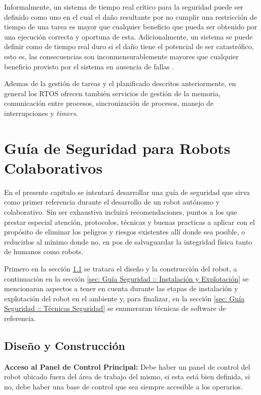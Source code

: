 \documentclass[withindex,glossary]{cam-thesis}
\begin{document}
Informalmente, un sistema de tiempo real crítico para la seguridad puede ser definido como uno en el cual el daño resultante por no cumplir una restricción de tiempo de una tarea es mayor que cualquier beneficio que pueda ser obtenido por una ejecución correcta y oportuna de esta. Adicionalmente, un sistema se puede definir como de tiempo real duro si el daño tiene el potencial de ser catastrófico, esto es, las consecuencias son inconmensurablemente mayores que cualquier beneficio provisto por el sistema en ausencia de fallas \cite{audsley1990real}.

Ademas de la gestión de tareas y el planificado descritos anteriormente, en general los RTOS ofrecen también servicios de gestión de la memoria, comunicación entre procesos, sincronización de procesos, manejo de interrupciones y \textit{timers}.

\chapter{Guía de Seguridad para Robots Colaborativos}
En el presente capitulo se intentará desarrollar una guía de seguridad que sirva como primer referencia durante el desarrollo de un robot autónomo y colaborativo. Sin ser exhaustiva incluirá recomendaciones, puntos a los que prestar especial atención, protocolos, técnicas y buenas practicas a aplicar con el propósito de eliminar los peligros y riesgos existentes allí donde sea posible, o reducirlos al mínimo donde no, en pos de salvaguardar la integridad física tanto de humanos como robots. 

Primero en la sección \ref{sec: Guía Seguridad :: Diseño y Construcción} se tratara el diseño y la construcción del robot, a continuación en la sección \ref{sec: Guía Seguridad :: Instalación y Explotación} se mencionaran aspectos a tener en cuenta durante las etapas de instalación y explotación del robot en el ambiente y, para finalizar, en la sección \ref{sec: Guía Seguridad :: Técnicas Seguridad} se enumeraran técnicas de software de referencia.

\section{Diseño y Construcción} \label{sec: Guía Seguridad :: Diseño y Construcción}
\textbf{Acceso al Panel de Control Principal:} Debe haber un panel de control del robot ubicado fuera del área de trabajo del mismo, si esta está bien definida, si no, debe haber una base de control que sea siempre accesible a los operarios.
\end{document}
